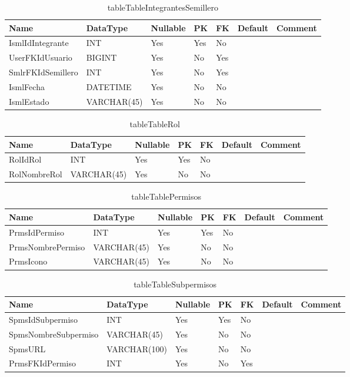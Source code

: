 \begin{table}
	\caption{tableTableIntegrantesSemillero}
	\label{labelTableIntegrantesSemillero}
	\begin{tabular}{ |l|l|l|l|l|l|l| }
		\hline
		Name & DataType & Nullable & PK & FK & Default & Comment \\ \hline
		IsmlIdIntegrante & INT & Yes & Yes & No &  & \\ \hline 
		UserFKIdUsuario & BIGINT & Yes & No & Yes &  & \\ \hline 
		SmlrFKIdSemillero & INT & Yes & No & Yes &  & \\ \hline 
		IsmlFecha & DATETIME & Yes & No & No &  & \\ \hline 
		IsmlEstado & VARCHAR(45) & Yes & No & No &  & \\ \hline 
		
	\end{tabular}
\end{table}


\begin{table}
	\caption{tableTableRol}
	\label{labelTableRol}
	\begin{tabular}{ |l|l|l|l|l|l|l| }
		\hline
		Name & DataType & Nullable & PK & FK & Default & Comment \\ \hline
		RolIdRol & INT & Yes & Yes & No &  & \\ \hline 
		RolNombreRol & VARCHAR(45) & Yes & No & No &  & \\ \hline 
		
	\end{tabular}
\end{table}


\begin{table}
	\caption{tableTablePermisos}
	\label{labelTablePermisos}
	\begin{tabular}{ |l|l|l|l|l|l|l| }
		\hline
		Name & DataType & Nullable & PK & FK & Default & Comment \\ \hline
		PrmsIdPermiso & INT & Yes & Yes & No &  & \\ \hline 
		PrmsNombrePermiso & VARCHAR(45) & Yes & No & No &  & \\ \hline 
		PrmsIcono & VARCHAR(45) & Yes & No & No &  & \\ \hline 
		
	\end{tabular}
\end{table}


\begin{table}
	\caption{tableTableSubpermisos}
	\label{labelTableSubpermisos}
	\begin{tabular}{ |l|l|l|l|l|l|l| }
		\hline
		Name & DataType & Nullable & PK & FK & Default & Comment \\ \hline
		SpmsIdSubpermiso & INT & Yes & Yes & No &  & \\ \hline 
		SpmsNombreSubpermiso & VARCHAR(45) & Yes & No & No &  & \\ \hline 
		SpmsURL & VARCHAR(100) & Yes & No & No &  & \\ \hline 
		PrmsFKIdPermiso & INT & Yes & No & Yes &  & \\ \hline 
		
	\end{tabular}
\end{table}


